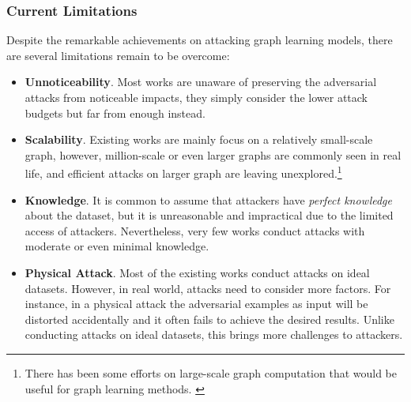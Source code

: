 \subsubsection{Current Limitations}
\label{attack_limitation}
Despite the remarkable achievements on attacking graph learning models, there are several limitations remain to be overcome:
\begin{itemize}
	\item \textbf{Unnoticeability}. Most works are unaware of preserving the adversarial attacks from noticeable impacts, they simply consider the lower attack budgets but far from enough instead.
	\item \textbf{Scalability}. Existing works are mainly focus on a relatively small-scale graph, however, million-scale or even larger graphs are commonly seen in real life, and efficient attacks on larger graph are leaving unexplored.\footnote{There has been some efforts on large-scale graph computation that would be useful for graph learning methods. \cite{zhu2016gemini,yang2019knightking}}
	\item \textbf{Knowledge}. It is common to assume that attackers have \emph{perfect knowledge} about the dataset, but it is unreasonable and impractical due to the limited access of attackers. Nevertheless, very few works conduct attacks with moderate or even minimal knowledge.
	\item \textbf{Physical Attack}. Most of the existing works conduct attacks on ideal datasets. However, in real world, attacks need to consider more factors. For instance, in a physical attack the adversarial examples as input will be distorted accidentally and it often fails to achieve the desired results. Unlike conducting attacks on ideal datasets, this brings more challenges to attackers.
\end{itemize}